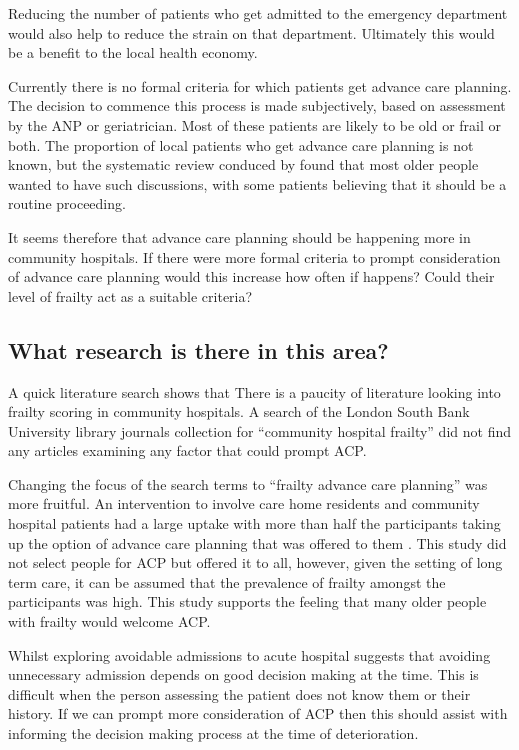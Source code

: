 \documentclass
[
	12pt,
	a4paper,
	oneside,
]{report}
\begin{document}
Reducing the number of patients who get admitted to the emergency department would
also help to reduce the strain on that department. Ultimately this would be a
benefit to the local health economy.

Currently there is no formal criteria for which patients get advance care planning.
The decision to commence this process is made subjectively, based on assessment 
by the ANP or geriatrician. Most of these patients are likely to be old or frail
or both. The proportion of local patients who get advance care planning is not known,
but the systematic review conduced by \textcite{sharp:13} found that most older
people wanted to have such discussions, with some patients believing that it 
should be a routine proceeding.

It seems therefore that advance care planning should be happening more in community
hospitals. If there were more formal criteria to prompt consideration
of advance care planning would this increase how often if happens? Could their 
level of frailty act as a suitable criteria?

\subsection{What research is there in this area?}

A quick literature search shows that There is a paucity of literature looking 
into frailty scoring in community hospitals.
A search of the London South Bank University library journals collection for ``community hospital frailty''
did not find any articles examining any factor that could prompt ACP.

Changing the focus of the search terms to ``frailty advance care planning''
was more fruitful.
An intervention to involve care home residents and community hospital patients
had a large uptake with more than half the participants taking up the option of
advance care planning that was offered to them \textcite{mcglade:17}. This 
study did not select people for ACP but offered it to all, however, given the 
setting of long term care, it can be assumed that the prevalence of frailty
amongst the participants was high. This study supports the feeling that many
older people with frailty would welcome ACP.

Whilst exploring avoidable admissions to acute hospital \textcite{mytton:12} 
suggests that avoiding unnecessary admission depends on good decision making at 
the time. This is difficult when the person assessing the patient does not know
them or their history. If we can prompt more consideration of ACP then this 
should assist with informing the decision making process at the time of 
deterioration.
\end{document}

